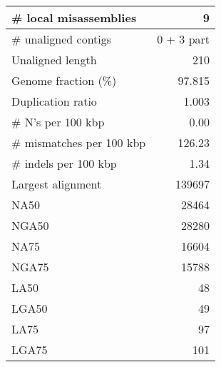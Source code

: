 \documentclass[12pt,a4paper]{article}
\begin{document}
\begin{table}[ht]
\begin{center}
\begin{tabular}{|l*{1}{|r}|}
\# local misassemblies & 9 \\ \hline
\# unaligned contigs & 0 + 3 part \\ \hline
Unaligned length & 210 \\ \hline
Genome fraction (\%) & 97.815 \\ \hline
Duplication ratio & 1.003 \\ \hline
\# N's per 100 kbp & 0.00 \\ \hline
\# mismatches per 100 kbp & 126.23 \\ \hline
\# indels per 100 kbp & 1.34 \\ \hline
Largest alignment & 139697 \\ \hline
NA50 & 28464 \\ \hline
NGA50 & 28280 \\ \hline
NA75 & 16604 \\ \hline
NGA75 & 15788 \\ \hline
LA50 & 48 \\ \hline
LGA50 & 49 \\ \hline
LA75 & 97 \\ \hline
LGA75 & 101 \\ \hline
\end{tabular}
\end{center}
\end{table}
\end{document}
